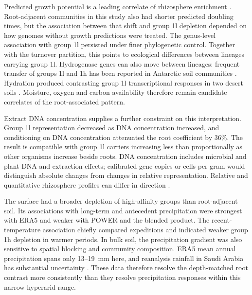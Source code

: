 \documentclass[11pt]{article}
\begin{document}
Predicted growth potential is a leading correlate of rhizosphere enrichment
\citep{lopez2023rhizosphere}. Root-adjacent communities in this study also had shorter predicted doubling
times, but the association between that shift and group 1l depletion depended on how genomes without
growth predictions were treated. The genus-level association with group 1l persisted under finer
phylogenetic control. Together with the turnover partition, this points to ecological differences
between lineages carrying group 1l. Hydrogenase genes can also move between lineages: frequent transfer
of groups 1l and 1h has been reported in Antarctic soil communities \citep{peng2026hgt}.
Hydration produced contrasting group 1l transcriptional responses in two desert soils
\citep{jordaan2020gobi,imminger2024resuscitation}. Moisture, oxygen and carbon availability therefore
remain candidate correlates of the root-associated pattern.

Extract DNA concentration supplies a further constraint on this interpretation. Group 1l representation
decreased as DNA concentration increased, and conditioning on DNA concentration attenuated the root
coefficient by 36\%. The result is compatible with group 1l carriers increasing less than proportionally
as other organisms increase beside roots. DNA concentration includes microbial and plant DNA and
extraction effects; calibrated gene copies or cells per gram would distinguish absolute changes from
changes in relative representation. Relative and quantitative rhizosphere profiles can differ in
direction \citep{azarbad2022relative}.

The surface had a broader depletion of high-affinity groups than root-adjacent soil. Its associations
with long-term and antecedent precipitation were strongest with ERA5 and weaker with POWER and the
blended product. The recent-temperature association chiefly compared expeditions and indicated weaker
group 1h depletion in warmer periods. In bulk soil, the precipitation gradient was also sensitive to
spatial blocking and community composition. ERA5 mean annual precipitation spans only 13--19~mm here,
and reanalysis rainfall in Saudi Arabia has substantial uncertainty \citep{wang2025sara}. These data
therefore resolve the depth-matched root contrast more consistently than they resolve precipitation
responses within this narrow hyperarid range.
\end{document}
